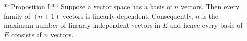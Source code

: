 **Proposition I:** Suppose a vector space has a basis of $n$ vectors. Then every family of $(n+1)$ vectors is linearly dependent. Consequently, $n$ is the maximum number of linearly independent vectors in $E$ and hence every basis of $E$ consists of $n$ vectors.
